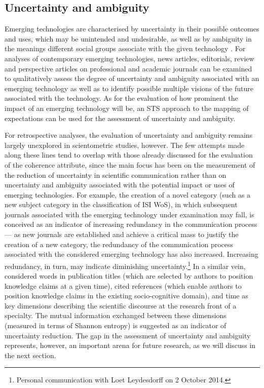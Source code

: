 \documentclass[11pt]{article}
\begin{document}
\subsection{Uncertainty and ambiguity}
Emerging technologies are characterised by uncertainty in their possible outcomes and uses, which may be unintended and undesirable, as well as by ambiguity in the meanings different social groups associate with the given technology \citep{Stirling2007a,Mitchell2007}. For analyses of contemporary emerging technologies, news articles, editorials, review and perspective articles on professional and academic journals can be examined to qualitatively assess the degree of uncertainty and ambiguity associated with an emerging technology as well as to identify possible multiple visions of the future associated with the technology. As for the evaluation of how prominent the impact of an emerging technology will be, an STS approach to the mapping of expectations can be used for the assessment of uncertainty and ambiguity.

For retrospective analyses, the evaluation of uncertainty and ambiguity remains largely unexplored in scientometric studies, however. The few attempts made along these lines tend to overlap with those already discussed for the evaluation of the coherence attribute, since the main focus has been on the measurement of the reduction of uncertainty in scientific communication rather than on uncertainty and ambiguity associated with the potential impact or uses of emerging technologies. For example, the creation of a novel category (such as a new subject category in the classification of ISI WoS), in which subsequent journals associated with the emerging technology under examination may fall, is conceived as an indicator of increasing redundancy in the communication process --- as new journals are established and achieve a critical mass to justify the creation of a new category, the redundancy of the communication process associated with the considered emerging technology has also increased. Increasing redundancy, in turn, may indicate diminishing uncertainty.\footnote{Personal communication with Loet Leydesdorff on 2 October 2014.} In a similar vein, \cite{Lucio-Arias2009} considered words in publication titles (which are selected by authors to position knowledge claims at a given time), cited references (which enable authors to position knowledge claims in the existing socio-cognitive domain), and time as key dimensions describing the scientific discourse at the research front of a specialty. The mutual information exchanged between these dimensions (measured in terms of Shannon entropy) is suggested as an indicator of uncertainty reduction. The gap in the assessment of uncertainty and ambiguity represents, however, an important arena for future research, as we will discuss in the next section.
\end{document}
